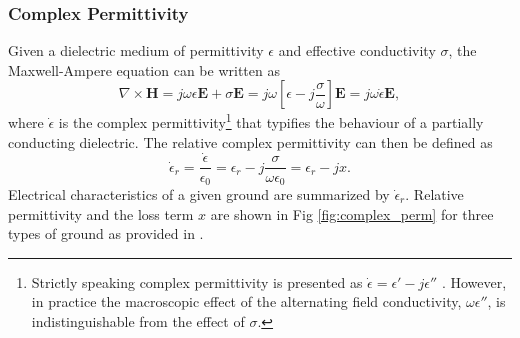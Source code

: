 \documentclass[10pt,journal,twoside]{IEEEtran}
\begin{document}
\subsubsection{Complex Permittivity}
Given a dielectric medium of permittivity $\epsilon$ and effective conductivity $\sigma$, the Maxwell-Ampere equation can be written as \cite{Jordan}
\begin{equation}
\nabla \times \mathbf{H} = j\omega\epsilon\mathbf{E} + \sigma \mathbf{E} = j\omega\left[ \epsilon - j\dfrac{\sigma}{\omega} \right]\mathbf{E} = j\omega\dot{\epsilon}\mathbf{E},
\end{equation}
where $\dot\epsilon$ is the complex permittivity\footnote{Strictly speaking complex permittivity is presented as $\dot{\epsilon} = \epsilon{'} - j\epsilon{''}$ \cite{Balanis:Electro}. However, in practice the macroscopic effect of the alternating field conductivity, $\omega\epsilon{''}$, is indistinguishable from the effect of $\sigma$.} that typifies the behaviour of a partially conducting dielectric. The relative complex permittivity can then be defined as
\begin{equation}
\dot\epsilon_{r} = \dfrac{\dot\epsilon}{\epsilon_0} = \epsilon_{r} - j\dfrac{\sigma}{\omega\epsilon_0} = \epsilon_{r} - jx. 
\end{equation}
Electrical characteristics of a given ground are summarized by $\dot\epsilon_{r}$. Relative permittivity and the loss term $x$ are shown in Fig \ref{fig:complex_perm} for three types of ground as provided in \cite{P527}.   
\end{document}
